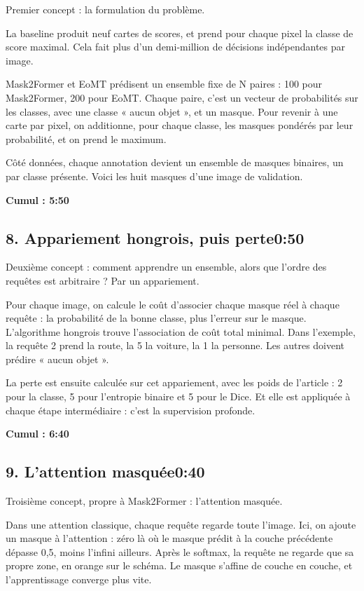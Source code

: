 \documentclass[11pt,a4paper]{article}
\newcommand{\cumul}[1]{\par{\hfill\small\color{accent}\bfseries #1}\par}
\newcommand{\tempo}[1]{\hfill{\normalsize\color{accent}#1}}
\begin{document}
Premier concept : la formulation du problème.

La baseline produit neuf cartes de scores, et prend pour chaque pixel la classe de score maximal. Cela fait plus d'un demi-million de décisions indépendantes par image.

Mask2Former et EoMT prédisent un ensemble fixe de N paires : 100 pour Mask2Former, 200 pour EoMT. Chaque paire, c'est un vecteur de probabilités sur les classes, avec une classe « aucun objet », et un masque. Pour revenir à une carte par pixel, on additionne, pour chaque classe, les masques pondérés par leur probabilité, et on prend le maximum.

Côté données, chaque annotation devient un ensemble de masques binaires, un par classe présente. Voici les huit masques d'une image de validation.

\cumul{Cumul : 5:50}

\subsection*{8. Appariement hongrois, puis perte\tempo{0:50}}

Deuxième concept : comment apprendre un ensemble, alors que l'ordre des requêtes est arbitraire ? Par un appariement.

Pour chaque image, on calcule le coût d'associer chaque masque réel à chaque requête : la probabilité de la bonne classe, plus l'erreur sur le masque. L'algorithme hongrois trouve l'association de coût total minimal. Dans l'exemple, la requête 2 prend la route, la 5 la voiture, la 1 la personne. Les autres doivent prédire « aucun objet ».

La perte est ensuite calculée sur cet appariement, avec les poids de l'article : 2 pour la classe, 5 pour l'entropie binaire et 5 pour le Dice. Et elle est appliquée à chaque étape intermédiaire : c'est la supervision profonde.

\cumul{Cumul : 6:40}

\subsection*{9. L'attention masquée\tempo{0:40}}

Troisième concept, propre à Mask2Former : l'attention masquée.

Dans une attention classique, chaque requête regarde toute l'image. Ici, on ajoute un masque à l'attention : zéro là où le masque prédit à la couche précédente dépasse 0,5, moins l'infini ailleurs. Après le softmax, la requête ne regarde que sa propre zone, en orange sur le schéma. Le masque s'affine de couche en couche, et l'apprentissage converge plus vite.
\end{document}
